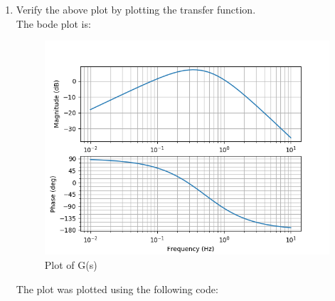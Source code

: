 \begin{enumerate}[label=\thesection.\arabic*.,ref=\thesection.\theenumi]
\item Verify the above plot by plotting the transfer function.\\
\solution
The bode plot is:
\begin{center}
    \begin{figure}[!h]
    \centering
    \includegraphics[width=\columnwidth]{./figs/ep18btech11016_fig2.png}
    \caption{Plot of G(s)}
    \label{fig:ep18btech11016_fig2}
    \end{figure}
\end{center}
The plot was plotted using the following code:


\end{enumerate}
